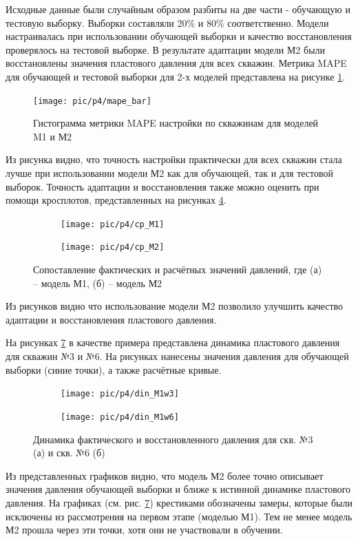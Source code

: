 \documentclass[14pt]{article}
\begin{document}
Исходные данные были случайным образом разбиты на две части - обучающую и тестовую выборку. Выборки составляли 20\% и 80\% соответственно. Модели настраивалась при использовании обучающей выборки и качество восстановления проверялось на тестовой выборке.
В результате адаптации модели М2 были восстановлены значения пластового давления для всех скважин. Метрика MAPE для обучающей и тестовой выборки для 2-х моделей представлена на рисунке \ref{fig:bar_mape_s1s2}.
\begin{figure}
	\centering
	\texttt{[image: pic/p4/mape\_bar]}
	\caption{Гистограмма метрики MAPE настройки по скважинам для моделей M1 и М2}
	\label{fig:bar_mape_s1s2}
\end{figure}
Из рисунка видно, что точность настройки практически для всех скважин стала лучше при использовании модели М2 как для обучающей, так и для тестовой выборок.
Точность адаптации и восстановления также можно оценить при помощи кросплотов, представленных на рисунках \ref{fig:well9_cp}.
\begin{figure}[!htb]
	\begin{subfigure}[b]{0.45\linewidth}
		\texttt{[image: pic/p4/cp\_M1]}
		\caption{}
		\label{fig:well9_cp_m1}
	\end{subfigure}
	\begin{subfigure}[b]{0.45\linewidth}
		\texttt{[image: pic/p4/cp\_M2]}
		\caption{}
		\label{fig:well9_cp_m2}
	\end{subfigure}
	\label{fig:well9_cp}
	\caption{Сопоставление фактических и расчётных значений давлений, где (а) -- модель М1, (б) -- модель М2}
	
\end{figure}
Из рисунков видно что использование модели М2 позволило улучшить качество адаптации и восстановления пластового давления.

На рисунках \ref{fig:din_9well_press} в качестве примера представлена динамика пластового давления для скважин №3 и №6. На рисунках нанесены значения давления для обучающей выборки (синие точки), а также расчётные кривые.

 \begin{figure}[!htb]
	\centering
	\begin{subfigure}[b]{0.9\linewidth}
		\texttt{[image: pic/p4/din\_M1w3]}
		\caption{}
		\label{fig:din_9well_press_3}
	\end{subfigure}
	\begin{subfigure}[b]{0.9\linewidth}
		\texttt{[image: pic/p4/din\_M1w6]}
		\caption{}
		\label{fig:din_9well_press_6}
	\end{subfigure}
	\caption{Динамика фактического и восстановленного давления для скв. №3 (а) и скв. №6 (б)}
	\label{fig:din_9well_press}
\end{figure}
Из представленных графиков видно, что модель М2 более точно описывает значения давления обучающей выборки и ближе к истинной динамике пластового давления.
На графиках (см. рис. \ref{fig:din_9well_press}) крестиками обозначены замеры, которые были исключены из рассмотрения на первом этапе (моделью М1). Тем не менее модель М2 прошла через эти точки, хотя они не участвовали в обучении.
\end{document}
